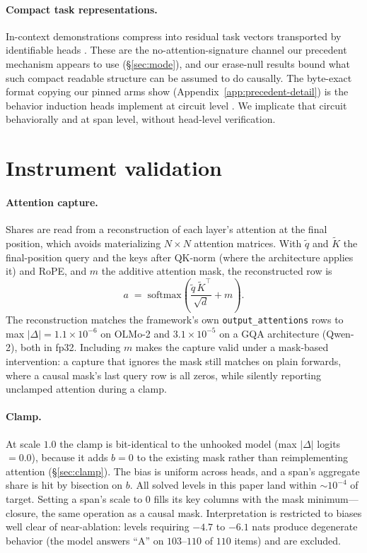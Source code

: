 \documentclass{article}
\begin{document}
\paragraph{Compact task representations.}
In-context demonstrations compress into residual task vectors \citep{hendel2023taskvectors}
transported by identifiable heads \citep{todd2024functionvectors}. These are the
no-attention-signature channel our precedent mechanism
appears to use (\S\ref{sec:mode}), and our erase-null results bound what such compact readable
structure can be assumed to do causally. The byte-exact format copying our pinned arms show
(Appendix~\ref{app:precedent-detail}) is the behavior induction heads implement at circuit
level \citep{olsson2022induction}. We implicate that circuit behaviorally and at span level,
without head-level verification.

\section{Instrument validation}
\label{app:instruments}

\paragraph{Attention capture.}
Shares are read from a reconstruction of each layer's attention at the final position, which
avoids materializing $N\times N$ attention matrices. With $\tilde q$ and $\tilde K$ the
final-position query and the keys after QK-norm (where the architecture applies it) and RoPE,
and $m$ the additive attention mask, the reconstructed row is
\[
  a \;=\; \mathrm{softmax}\!\left(\frac{\tilde q\,\tilde K^{\top}}{\sqrt{d}} + m\right).
\] The reconstruction matches the
framework's own \texttt{output\_attentions} rows to max $|\Delta| = 1.1\times10^{-6}$ on OLMo-2
and $3.1\times10^{-5}$ on a GQA architecture (Qwen-2), both in fp32. Including $m$ makes the capture valid under a mask-based intervention: a capture that
ignores the mask still matches on plain forwards, where a causal mask's last query row is all
zeros, while silently reporting unclamped attention during a clamp.

\paragraph{Clamp.}
At scale $1.0$ the clamp is bit-identical to the unhooked model (max $|\Delta|$ logits $=0.0$),
because it adds $b{=}0$ to the existing mask rather than reimplementing attention
(\S\ref{sec:clamp}). The bias is
uniform across heads, and a span's aggregate share is hit by bisection on $b$. All solved levels
in this paper land within ${\sim}10^{-4}$ of target. Setting a span's scale to $0$ fills its key
columns with the mask minimum---closure, the same operation as a causal mask. Interpretation is
restricted to biases well clear of near-ablation: levels requiring $-4.7$ to $-6.1$ nats produce
degenerate behavior (the model answers ``A'' on $103$--$110$ of $110$ items) and are excluded.
\end{document}
